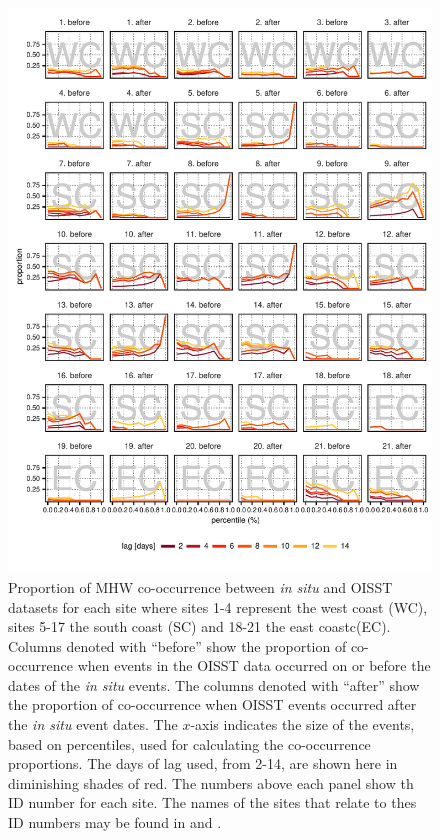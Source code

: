 \documentclass[a4paper,10pt,review]{elsarticle}
\begin{document}
\begin{figure}
\includegraphics[width=1.0\textwidth]{figure4.pdf}
\caption{Proportion of MHW co-occurrence between \emph{in situ} and OISST datasets for each site where sites 1-4 represent the west coast (WC), sites 5-17 the south coast (SC) and 18-21 the east coastc(EC). Columns denoted with ``before'' show the proportion of co-occurrence when events in the OISST data occurred on or before the dates of the \emph{in situ} events. The columns denoted with ``after'' show the proportion of co-occurrence when OISST events occurred after the \emph{in situ} event dates. The $x$-axis indicates the size of the events, based on percentiles, used for calculating the co-occurrence proportions. The days of lag used, from 2-14, are shown here in diminishing shades of red. The numbers above each panel show th ID number for each site. The names of the sites that relate to thes ID numbers may be found in  and .}
\label{fig:Figure4}
\end{figure}
\end{document}
